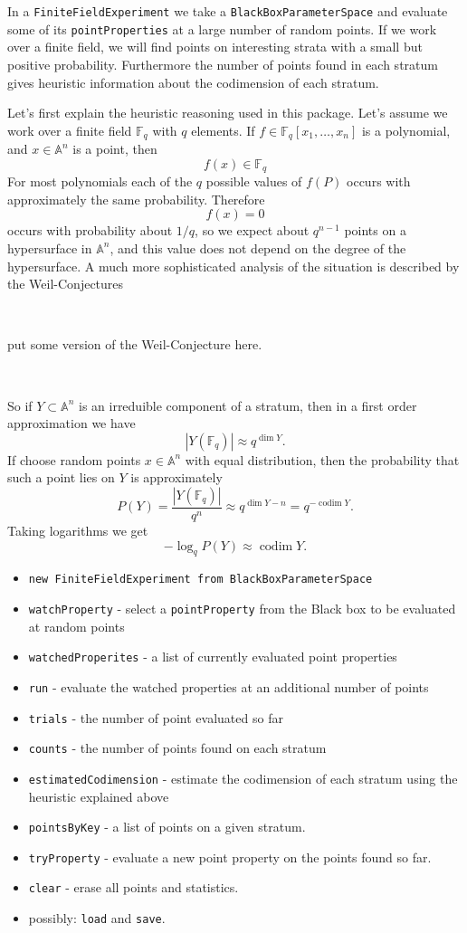 \documentclass[12pt,a4paper]{amsart}
\theoremstyle{plain}
\theoremstyle{definition}
\newcommand{\FF}{\mathbb F}
\renewcommand{\AA}{\mathbb A}
\DeclareMathOperator{\codim}{codim}
\begin{document}
In a {\tt FiniteFieldExperiment} we take a {\tt BlackBoxParameterSpace} and evaluate some of its {\tt pointProperties} at a large number of random points. If we work over a finite field, we will find points on interesting strata with a small but positive probability. Furthermore the number of points found in each stratum gives heuristic information about the codimension of each stratum.

Let's first explain the heuristic reasoning used in this package. Let's assume we work over a finite field $\FF_q$ with $q$ elements. If $f \in \FF_q[x_1,\dots,x_n]$ is a polynomial, and $x \in \AA^n$ is a point, then
\[
	f(x) \in \FF_q
\]
For most polynomials each of the $q$ possible values of $f(P)$ occurs with approximately the same probability. Therefore 
\[
	f(x) = 0
\]
occurs with probability about $1/q$, so we expect about $q^{n-1}$ points on a hypersurface in $\AA^n$, and this value does not depend on the degree of the hypersurface. A much more sophisticated analysis of the situation is described by the Weil-Conjectures 

\

{\color{red} put some version of the Weil-Conjecture here.}

\

So if $Y \subset \AA^n$ is an irreduible component of a stratum, then  in a first order approximation we have
\[
	|Y(\FF_q) | \approx q^{\dim Y}.
\]
If choose random points $x \in \AA^n$ with equal distribution, then the probability that such a point lies on $Y$ is approximately
\[
	P(Y) = \frac{|Y(\FF_q)|}{q^n} \approx q^{\dim Y - n} = q^{-\codim Y}.
\]
Taking logarithms we get
\[
	- \log_q P(Y) \approx \codim Y.
\]

\begin{itemize}
\item {\tt new FiniteFieldExperiment from BlackBoxParameterSpace}
\item {\tt watchProperty} - select a {\tt pointProperty} from the Black box to be evaluated at random points
\item {\tt watchedProperites} - a list of currently evaluated point properties
\item {\tt run} - evaluate the watched properties at an additional number of points
\item {\tt trials} - the number of point evaluated so far
\item {\tt counts} - the number of points found on each stratum
\item {\tt estimatedCodimension} - estimate the codimension of each stratum using the heuristic explained above
\item {\tt pointsByKey} - a list of points on a given stratum. 
\item {\tt tryProperty} -  evaluate a new point property on the points found so far.
\item {\tt clear} - erase all points and statistics.
\item {\color{red} possibly:} {\tt load} and {\tt save}.
\end{itemize}
\end{document}
